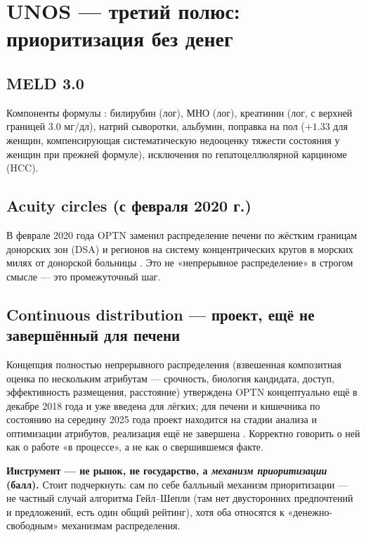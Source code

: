 \documentclass[11pt]{article}
\begin{document}
\section{UNOS — третий полюс: приоритизация без денег}

\subsection{MELD 3.0}
Компоненты формулы \cite{optn_meld3}: билирубин (лог), МНО (лог), креатинин (лог, с верхней границей 3.0 мг/дл), натрий сыворотки, альбумин, поправка на пол ($+1.33$ для женщин, компенсирующая систематическую недооценку тяжести состояния у женщин при прежней формуле), исключения по гепатоцеллюлярной карциноме (HCC).

\subsection{Acuity circles (с февраля 2020 г.)}
В феврале 2020 года OPTN заменил распределение печени по жёстким границам донорских зон (DSA) и регионов на систему концентрических кругов в морских милях от донорской больницы \cite{optn_acuity2020}. Это не «непрерывное распределение» в строгом смысле — это промежуточный шаг.

\subsection{Continuous distribution — проект, ещё не завершённый для печени}
Концепция полностью непрерывного распределения (взвешенная композитная оценка по нескольким атрибутам — срочность, биология кандидата, доступ, эффективность размещения, расстояние) утверждена OPTN концептуально ещё в декабре 2018 года и уже введена для лёгких; для печени и кишечника по состоянию на середину 2025 года проект находится на стадии анализа и оптимизации атрибутов, реализация ещё не завершена \cite{optn_cd2025}. Корректно говорить о ней как о работе «в процессе», а не как о свершившемся факте.

\textbf{Инструмент — не рынок, не государство, а \emph{механизм приоритизации} (балл).} Стоит подчеркнуть: сам по себе балльный механизм приоритизации — не частный случай алгоритма Гейл--Шепли (там нет двусторонних предпочтений и предложений, есть один общий рейтинг), хотя оба относятся к «денежно-свободным» механизмам распределения.
\end{document}
